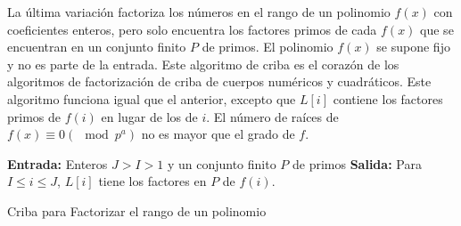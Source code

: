         La última variación factoriza los números en el rango de un polinomio $f(x)$ con coeficientes enteros, pero solo encuentra los factores primos de cada $f(x)$ que se encuentran en un conjunto finito $P$ de primos. El polinomio $f(x)$ se supone fijo y no es parte de la entrada. Este algoritmo de criba es el corazón de los algoritmos de factorización de criba de cuerpos numéricos y cuadráticos. Este algoritmo funciona igual que el anterior, excepto que $L[i]$ contiene los factores primos de $f(i)$ en lugar de los de $i$. El número de raíces de $f(x) \equiv 0 (\mod p^a)$ no es mayor que el grado de $f$.

        \begin{algorithm}[H]
            \SetAlgoLined
            \textbf{Entrada:} Enteros $J > I > 1$ y un conjunto finito $P$ de primos\;
            \textbf{Salida:} Para $I \leq i \leq J$, $L[i]$ tiene los factores en $P$ de $f(i)$.\ 
            \caption{Criba para Factorizar el rango de un polinomio}
        \end{algorithm}
        
